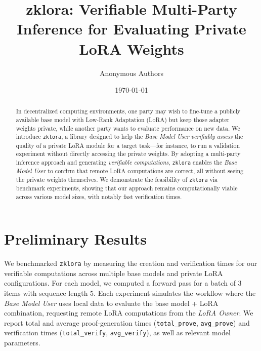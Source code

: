\documentclass[11pt]{article}
\title{\textbf{zklora: Verifiable Multi-Party Inference for Evaluating Private LoRA Weights}}
\author{Anonymous Authors}
\date{\today}
\begin{document}
\maketitle

\begin{abstract}
In decentralized computing environments, one party may wish to fine-tune a publicly available base model with Low-Rank Adaptation (LoRA) but keep those adapter weights private, while another party wants to evaluate performance on new data. 
We introduce \texttt{zklora}, a library designed to help the \emph{Base Model User} \emph{verifiably assess} the quality of a private LoRA module for a target task---for instance, to run a validation experiment without directly accessing the private weights. 
By adopting a multi-party inference approach and generating \emph{verifiable computations}, \texttt{zklora} enables the \emph{Base Model User} to confirm that remote LoRA computations are correct, all without seeing the private weights themselves. 
We demonstrate the feasibility of \texttt{zklora} via benchmark experiments, showing that our approach remains computationally viable across various model sizes, with notably fast verification times.
\end{abstract}

\section{Preliminary Results}

We benchmarked \texttt{zklora} by measuring the creation and verification times for our verifiable computations across multiple base models and private LoRA configurations. For each model, we computed a forward pass for a batch of 3 items with sequence length 5. 
Each experiment simulates the workflow where the \emph{Base Model User} uses local data to evaluate the base model + LoRA combination, requesting remote LoRA computations from the \emph{LoRA Owner}. 
We report total and average proof-generation times (\texttt{total\_prove}, \texttt{avg\_prove}) and verification times (\texttt{total\_verify}, \texttt{avg\_verify}), as well as relevant model parameters.
\end{document}
